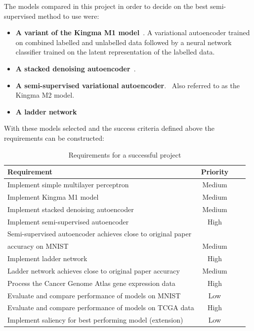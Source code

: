 \documentclass[12pt,a4paper,twoside,openright]{report}
\begin{document}
The models compared in this project in order to decide on the best semi-supervised method to use were:

\begin{itemize}
  \item \textbf{A variant of the Kingma M1 model}~\cite{DBLP:journals/corr/KingmaRMW14}. A variational autoencoder trained on combined 
        labelled and unlabelled data followed by a neural network classifier trained on the latent representation of the labelled data.
  \item \textbf{A stacked denoising autoencoder}~\cite{Vincent:2010:SDA:1756006.1953039}.
  \item \textbf{A semi-supervised variational autoencoder}.~\cite{DBLP:journals/corr/KingmaRMW14} Also referred to as the Kingma M2 model.
  \item \textbf{A ladder network}~\cite{DBLP:journals/corr/RasmusVHBR15}
\end{itemize}

With these models selected and the success criteria defined above the requirements can be constructed:

\begin{table}[H]
  \label{tab:requirements}
  \small %
  \centering %
  \begin{tabular}{lccr} %
  \toprule[\heavyrulewidth]\toprule[\heavyrulewidth]
  \textbf{Requirement} & \textbf{Priority} \\ 
  \midrule
  Implement simple multilayer perceptron & Medium \\
  Implement Kingma M1 model & Medium \\
  Implement stacked denoising autoencoder & Medium \\
  Implement semi-supervised autoencoder & High \\
  Semi-supervised autoencoder achieves close to original paper \\ accuracy on MNIST & Medium \\
  Implement ladder network & High \\
  Ladder network achieves close to original paper accuracy & Medium \\
  Process the Cancer Genome Atlas gene expression data & High \\
  Evaluate and compare performance of models on MNIST & Low \\
  Evaluate and compare performance of models on TCGA data & High \\
  Implement saliency for best performing model (extension) & Low \\
  \bottomrule[\heavyrulewidth] 
  \end{tabular}
  \caption{Requirements for a successful project} 
\end{table}
\end{document}
